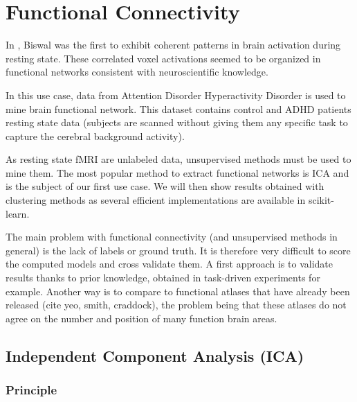 \documentclass{frontiersSCNS} %
\begin{document}
\section{Functional Connectivity}

In \cite{biswal1995}, Biswal was the first to exhibit coherent patterns in
brain activation during resting state. These correlated voxel activations seemed
to be organized in functional networks consistent with neuroscientific knowledge.


In this use case, data from Attention Disorder Hyperactivity Disorder is used to
mine brain functional network. This dataset contains control and ADHD patients
resting state data (subjects are scanned without giving them any specific task
to capture the cerebral background activity).

As resting state fMRI are unlabeled data, unsupervised methods must be used to
mine them. The most popular method to extract functional networks is ICA and
is the subject of our first use case. We will then show results obtained with
clustering methods as several efficient implementations are available in
scikit-learn.

The main problem with functional connectivity (and unsupervised methods in
general) is the lack of labels or ground truth. It is therefore very difficult
to score the computed models and cross validate them. A first approach is to
validate results thanks to prior knowledge, obtained in task-driven experiments
for example. Another way is to compare to functional atlases that have already
been released (cite yeo, smith, craddock), the problem being that these atlases
do not agree on the number
and position of many function brain areas.

\subsection{Independent Component Analysis (ICA)}

\subsubsection{Principle}
\end{document}
